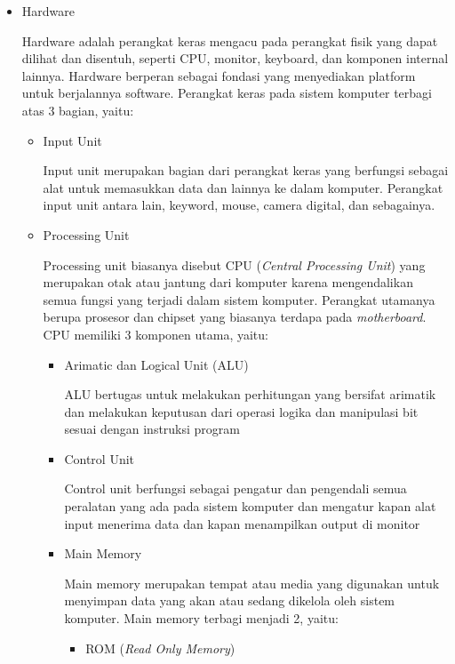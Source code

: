 \documentclass[12pt]{article}
\begin{document}
    \begin{itemize}
        \item Hardware
        \par
        Hardware adalah perangkat keras mengacu pada perangkat fisik yang dapat dilihat dan disentuh, seperti CPU, monitor, keyboard, dan komponen internal lainnya. Hardware berperan sebagai fondasi yang menyediakan platform untuk berjalannya software. Perangkat keras pada sistem komputer terbagi atas 3 bagian, yaitu:
        \begin{itemize}
            \item Input Unit
            \par 
            Input unit merupakan bagian dari perangkat keras yang berfungsi sebagai alat untuk memasukkan data dan lainnya ke dalam komputer. Perangkat input unit antara lain, keyword, mouse, camera digital, dan sebagainya.
            \item Processing Unit
            \par
            Processing unit biasanya disebut CPU (\textit{Central Processing Unit}) yang merupakan otak atau jantung dari komputer karena mengendalikan semua fungsi yang terjadi dalam sistem komputer. Perangkat utamanya berupa prosesor dan chipset yang biasanya terdapa pada \textit{motherboard}. CPU memiliki 3 komponen utama, yaitu:
            \begin{itemize}
                \item Arimatic dan Logical Unit (ALU)
                \par
                ALU bertugas untuk melakukan perhitungan yang bersifat arimatik dan melakukan keputusan dari operasi logika dan manipulasi bit sesuai dengan instruksi program
                \item Control Unit
                \par
                Control unit berfungsi sebagai pengatur dan pengendali semua peralatan yang ada pada sistem komputer dan mengatur kapan alat input menerima data dan kapan menampilkan output di monitor
                \item Main Memory
                \par
                Main memory merupakan tempat atau media yang digunakan untuk menyimpan data yang akan atau sedang dikelola oleh sistem komputer. Main memory terbagi menjadi 2, yaitu:
                \begin{itemize}
                    \item ROM (\textit{Read Only Memory})

\end{itemize}
\end{itemize}
\end{itemize}
\end{itemize}
\end{document}
